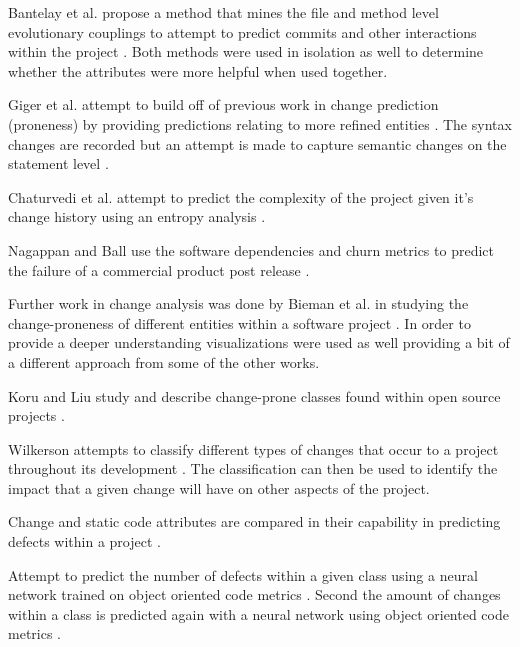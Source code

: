Bantelay et al. propose a method that mines the file and method level evolutionary couplings to attempt to predict commits and other interactions within the project \cite{Bantelay2013}. Both methods were used in isolation as well to determine whether the attributes were more helpful when used together.

Giger et al. attempt to build off of previous work in change prediction (proneness) by providing predictions relating to more refined entities \cite{Giger2012}. The syntax changes are recorded but an attempt is made to capture semantic changes on the statement level \cite{Giger2012}.

Chaturvedi et al. attempt to predict the complexity of the project given it's change history using an entropy analysis \cite{Chaturvedi2014}.

Nagappan and Ball use the software dependencies and churn metrics to predict the failure of a commercial product post release \cite{Nagappan2007}.

Further work in change analysis was done by Bieman et al. in studying the change-proneness of different entities within a software project \cite{Bieman2003}. In order to provide a deeper understanding visualizations were used as well providing a bit of a different approach from some of the other works.

Koru and Liu study and describe change-prone classes found within open source projects \cite{GunesKoru2007}.

Wilkerson attempts to classify different types of changes that occur to a project throughout its development \cite{Wilkerson2012}. The classification can then be used to identify the impact that a given change will have on other aspects of the project.

Change and static code attributes are compared in their capability in predicting defects within a project \cite{Moser2008}.

Attempt to predict the number of defects within a given class using a neural network trained on object oriented code metrics \cite{Thwin2005}. Second the amount of changes within a class is predicted again with a neural network using object oriented code metrics \cite{Thwin2005}.

